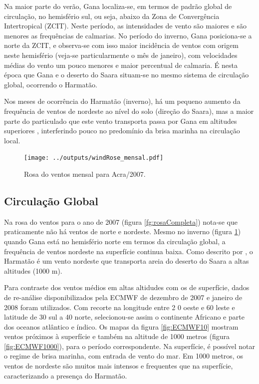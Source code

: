 Na maior parte do verão, Gana localiza-se, em termos de padrão global de 
circulação, no hemisfério sul, ou seja, abaixo da Zona de Convergência 
Intertropical (ZCIT). Neste período, as intensidades de vento são maiores e 
são menores as frequências de calmarias. No período do inverno, Gana 
posiciona-se a norte da ZCIT, e observa-se com isso maior incidência de 
ventos com origem neste hemisfério (veja-se particularmente o mês 
de janeiro), 
com velocidades médias do vento um pouco menores e maior percentual
de calmaria. É nesta época que Gana e o deserto do Saara situam-se no mesmo 
sistema de circulação global, ocorrendo o Harmatão. 

Nos meses de ocorrência do Harmatão (inverno), há um pequeno aumento da 
frequência de ventos de nordeste ao nível do solo (direção do Saara), mas a 
maior parte do particulado que este vento transporta passa por Gana em 
altitudes superiores \citep{breuning2005}, interferindo pouco no predomínio 
da brisa marinha na circulação local.%

\begin{figure}[H]
  \centering
  \texttt{[image: ../outputs/windRose\_mensal.pdf]}
  \caption{Rosa do ventos mensal para Acra/2007. \label{fig:windRose_mensal}}
\end{figure}

\newpage
\subsection{Circulação Global}

Na rosa do ventos para o ano de 2007 (figura \ref{fg:rosaCompleta}) nota-se 
que praticamente não há ventos de norte e nordeste. Mesmo no inverno 
(figura \ref{fig:windRose_mensal}) quando Gana está no hemisfério norte em 
termos da circulação global, a frequência de ventos nordeste na superfície 
continua baixa. 
Como descrito por \citet{breuning2005}, o Harmatão é um vento nordeste 
que transporta areia do deserto do Saara a altas altitudes (1000 m).

Para contraste dos ventos médios em altas altidudes com os de superfície, 
dados de re-análise disponibilizados pela ECMWF de dezembro de 
2007 e janeiro de 2008 foram utilizados. Com recorte na longitude entre 2
0 oeste e 60 leste e latitude de 30 sul a 40 norte, selecionou-se assim o 
continente Africano e parte dos oceanos atlântico e índico. 
Os mapas da figura \ref{fig:ECMWF10} mostram
ventos próximos à superfície e também na altitude 
de 1000 metros (figura \ref{fig:ECMWF1000}), para o  período correspondente. 
Na superfície, é possível notar o regime de brisa marinha, com entrada de vento 
do mar. Em 1000 metros, os ventos de nordeste são muitos mais intensos e 
frequentes que na superfície, caracterizando a presença do Harmatão. 

